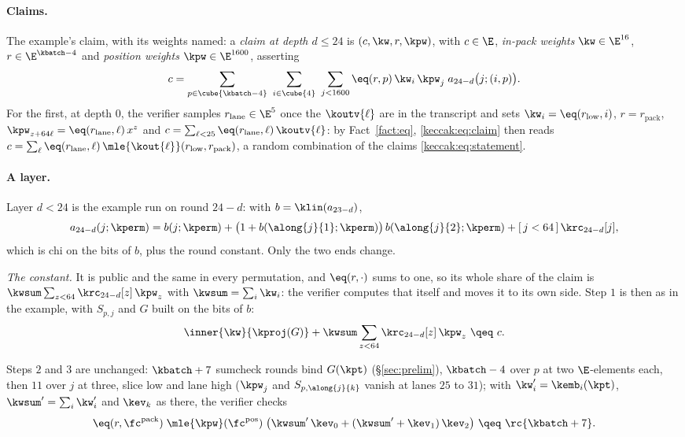 \paragraph{Claims.}\label{keccak:claims} The example's claim, with its weights named: a \emph{claim at depth $d\le24$} is $(c,\kw,r,\kpw)$, with $c\in\E$, \emph{in-pack weights} $\kw\in\E^{16}$, $r\in\E^{\kbatch-4}$ and \emph{position weights} $\kpw\in\E^{1600}$, asserting
\begin{equation}\label{keccak:eq:claim}
c=\sum_{p\in\cube{\kbatch-4}}\ \sum_{i\in\cube{4}}\ \sum_{j<1600}\eq(r,p)\,\kw_i\,\kpw_j\;a_{24-d}\bigl(j;(i,p)\bigr).
\end{equation}
For the first, at depth $0$, the verifier samples $r_{\mathrm{lane}}\in\E^{5}$ once the $\koutv{\ell}$ are in the transcript and sets $\kw_i=\eq(r_{\mathrm{low}},i)$, $r=r_{\mathrm{pack}}$, $\kpw_{z+64\ell}=\eq(r_{\mathrm{lane}},\ell)\,x^{z}$ and $c=\sum_{\ell<25}\eq(r_{\mathrm{lane}},\ell)\,\koutv{\ell}$: by Fact~\ref{fact:eq}, \eqref{keccak:eq:claim} then reads $c=\sum_\ell\eq(r_{\mathrm{lane}},\ell)\,\mle{\kout{\ell}}(r_{\mathrm{low}},r_{\mathrm{pack}})$, a random combination of the claims \eqref{keccak:eq:statement}.

\paragraph{A layer.}\label{keccak:layer} Layer $d<24$ is the example run on round $24-d$: with $b=\klin(a_{23-d})$,
\begin{equation}\label{keccak:eq:chi}
a_{24-d}(j;\kperm)=b(j;\kperm)+\bigl(1+b(\along{j}{1};\kperm)\bigr)\,b(\along{j}{2};\kperm)+[\,j<64\,]\,\krc_{24-d}[j],
\end{equation}
which is chi on the bits of $b$, plus the round constant. Only the two ends change.

\emph{The constant.} It is public and the same in every permutation, and $\eq(r,\cdot)$ sums to one, so its whole share of the claim is $\kwsum\sum_{z<64}\krc_{24-d}[z]\,\kpw_z$ with $\kwsum=\sum_i\kw_i$: the verifier computes that itself and moves it to its own side. Step $1$ is then as in the example, with $S_{p,j}$ and $G$ built on the bits of $b$:
\begin{equation}\label{keccak:eq:projection}
\inner{\kw}{\kproj(G)}+\kwsum\sum_{z<64}\krc_{24-d}[z]\,\kpw_z\ \qeq\ c.
\end{equation}

Steps $2$ and $3$ are unchanged: $\kbatch+7$ sumcheck rounds bind $G(\kpt)$ (\S\ref{sec:prelim}), $\kbatch-4$ over $p$ at two $\E$-elements each, then $11$ over $j$ at three, slice low and lane high ($\kpw_j$ and $S_{p,\along{j}{k}}$ vanish at lanes $25$ to $31$); with $\kw'_i=\kemb_i(\kpt)$, $\kwsum'=\sum_i\kw'_i$ and $\kev_k$ as there, the verifier checks
\begin{equation}\label{keccak:eq:terminal}
\eq(r,\fc^{\mathrm{pack}})\;\mle{\kpw}(\fc^{\mathrm{pos}})\;\bigl(\kwsum'\,\kev_0+(\kwsum'+\kev_1)\,\kev_2\bigr)\ \qeq\ \rc{\kbatch+7}.
\end{equation}


